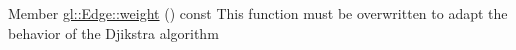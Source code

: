 
\begin{DoxyRefList}
\item[Member \mbox{\hyperlink{classgl_1_1_edge_acbf0d9e4e89497298783559a0210286e}{gl::Edge::weight}} () const]\label{todo__todo000001}%
%
This function must be overwritten to adapt the behavior of the Djikstra algorithm 
\end{DoxyRefList}